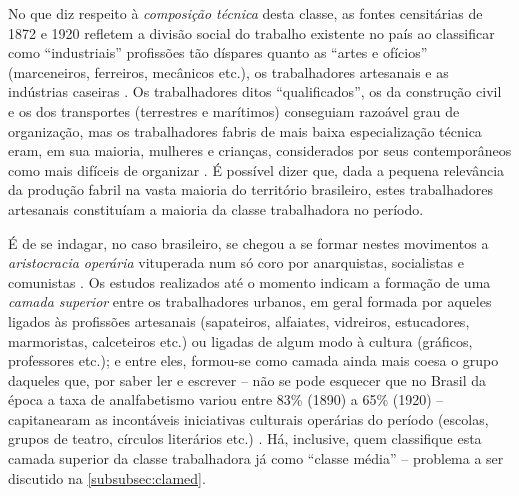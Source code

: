 No que diz respeito à \textit{composição técnica} desta classe, as fontes censitárias de 1872 e 1920 refletem a divisão social do trabalho existente no país ao classificar como ``industriais'' profissões tão díspares quanto as ``artes e ofícios'' (marceneiros, ferreiros, mecânicos etc.), os trabalhadores artesanais e as indústrias caseiras \cite[p.~141]{pinheiro_prolind_1977}. Os trabalhadores ditos ``qualificados'', os da construção civil e os dos transportes (terrestres e marítimos) conseguiam razoável grau de organização, mas os trabalhadores fabris de mais baixa especialização técnica eram, em sua maioria, mulheres e crianças, considerados por seus contemporâneos como mais difíceis de organizar \cite[p.~152]{pinheiro_prolind_1977}. É possível dizer que, dada a pequena relevância da produção fabril na vasta maioria do território brasileiro, estes trabalhadores artesanais constituíam a maioria da classe trabalhadora no período.

É de se indagar, no caso brasileiro, se chegou a se formar nestes movimentos a \textit{aristocracia operária} vituperada num só coro por anarquistas, socialistas e comunistas \cite{bakunin_contramarx_2015,engels_1892pref_1990,lenin_imperialismo_1987}. Os estudos realizados até o momento indicam a formação de uma \textit{camada superior} entre os trabalhadores urbanos, em geral formada por aqueles ligados às profissões artesanais (sapateiros, alfaiates, vidreiros, estucadores, marmoristas, calceteiros etc.) ou ligadas de algum modo à cultura (gráficos, professores etc.); e entre eles, formou-se como camada ainda mais coesa o grupo daqueles que, por saber ler e escrever -- não se pode esquecer que no Brasil da época a taxa de analfabetismo variou entre 83\% (1890) a 65\% (1920) -- capitanearam as incontáveis iniciativas culturais operárias do período (escolas, grupos de teatro, círculos literários etc.) \cite{gomes_velhos_1988,goes_formacao_1988,hardman_patripatr_2002,pinheiro_prolind_1977}. Há, inclusive, quem classifique esta camada superior da classe trabalhadora já como ``classe média'' -- problema a ser discutido na \autoref{subsubsec:clamed}.

